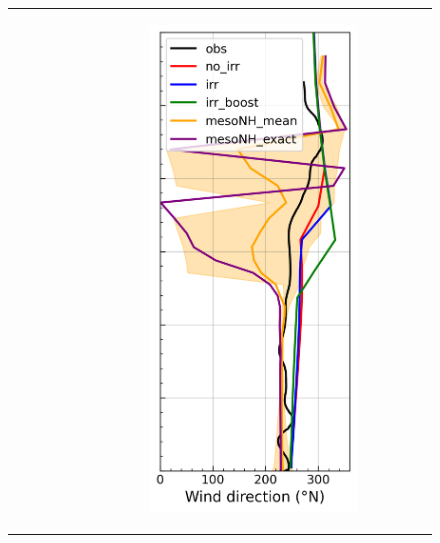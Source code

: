 \begin{figure}[hbtp]
{\begin{tabular}{@{}cccc@{}}
\begin{subfigure}[t]{0.283\textwidth}
        \end{subfigure} &
        \begin{subfigure}[t]{0.283\textwidth}
            \caption{}
            \includegraphics[width=\textwidth]{images/chap5/profiles/profile_cendrosa_wind_direction_1507_.png}

\end{subfigure}
\end{tabular}}
\end{figure}
